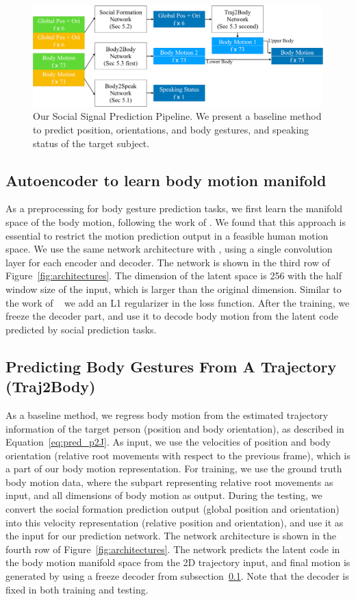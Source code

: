 \begin{figure}[t]	
	\includegraphics[width=\textwidth]{ssp_fig/ssp_pipeline}
	\caption{Our Social Signal Prediction Pipeline. We present a baseline method to predict position, orientations, and body gestures, and speaking status of the target subject. }
	\label{fig:pipeline}
\end{figure}

\subsection{Autoencoder to learn body motion manifold}
\label{sec:autoencoder}
As a preprocessing for body gesture prediction tasks, we first learn the manifold space of the body motion, following the work of \cite{holden2016deep}. We found that this approach is essential to restrict the motion prediction output in a feasible human motion space. We use the same network architecture with \cite{holden2016deep}, using a single convolution layer for each encoder and decoder. The network is shown in the third row of  Figure~\ref{fig:architectures}. The dimension of the latent space is 256 with the half window size of the input, which is larger than the original dimension. Similar to the work of ~\cite{holden2016deep} we add an L1 regularizer in the loss function. After the training, we freeze the decoder part, and use it to decode body motion from the latent code predicted by social prediction tasks.

\subsection{Predicting Body Gestures From A Trajectory (Traj2Body)}
\label{sec:traj2body}
As a baseline method, we regress body motion from the estimated trajectory information of the target person (position and body orientation), as described in Equation~\ref{eq:pred_p2J}. As input, we use the velocities of position and body orientation (relative root movements with respect to the previous frame), which is a part of our body motion representation. For training, we use the ground truth body motion data, where the subpart representing relative root movements as input, and all dimensions of body motion as output. During the testing, we convert the social formation prediction output (global position and orientation) into this velocity representation (relative position and orientation), and use it as the input for our prediction network. The network architecture is shown in the fourth row of Figure~\ref{fig:architectures}. The network predicts the latent code in the body motion manifold space from the 2D trajectory input, and final motion is generated by using a freeze decoder from subsection~\ref{sec:autoencoder}. Note that the decoder is fixed in both training and testing. 

